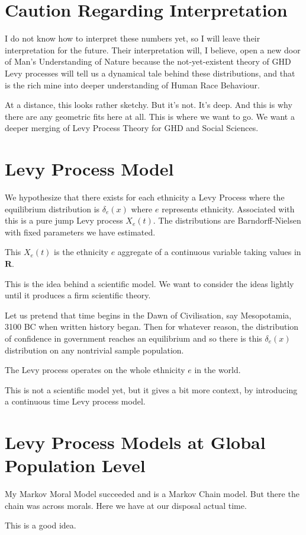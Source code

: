 \documentclass{amsart}
\begin{document}
\section{Caution Regarding Interpretation}

I do not know how to interpret these numbers yet, so I will leave their interpretation for the future.  Their interpretation will, I believe, open a new door of Man's Understanding of Nature because the not-yet-existent theory of GHD Levy processes will tell us a dynamical tale behind these distributions, and that is the rich mine into deeper understanding of Human Race Behaviour.

At a distance, this looks rather sketchy.  But it's not.  It's deep.  And this is why there are any geometric fits here at all.  This is where we want to go.  We want a deeper merging of Levy Process Theory for GHD and Social Sciences.

\section{Levy Process Model}

We hypothesize that there exists for each ethnicity a Levy Process where the equilibrium distribution is $\delta_e(x)$ where $e$ represents ethnicity.  Associated with this is a pure jump Levy process $X_e(t)$.  The distributions are Barndorff-Nielsen with fixed parameters we have estimated.  

This $X_e(t)$ is the ethnicity $e$ aggregate of a continuous variable taking values in $\mathbf{R}$. 

This is the idea behind a scientific model. We want to consider the ideas lightly until it produces a firm scientific theory.

Let us pretend that  time begins in the Dawn of Civilisation, say Mesopotamia, 3100 BC when written history began.  Then for whatever reason, the distribution of confidence in government reaches an equilibrium and so there is this $\delta_e(x)$ distribution on any nontrivial sample population.

The Levy process operates on the whole ethnicity $e$ in the world. 

This is not a scientific model yet, but it gives a bit more context, by introducing a continuous time Levy process model.

\section{Levy Process Models at Global Population Level}

My Markov Moral Model succeeded and is a Markov Chain model.  But there the chain was across morals.  Here we have at our disposal actual time. 

This is a good idea.  
 
\end{document}
